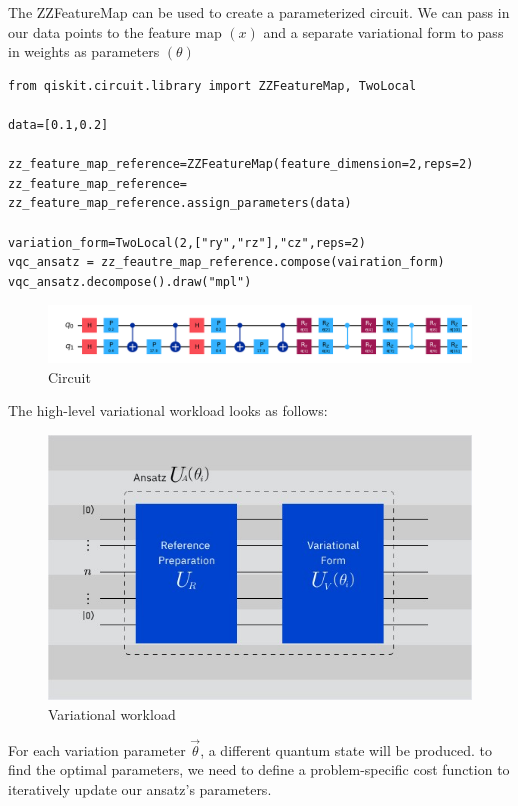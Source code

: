 \documentclass[12pt, oneside]{book}
\theoremstyle{definition}
\theoremstyle{definition}
\theoremstyle{remark}
\begin{document}
The ZZFeatureMap can be used to create a parameterized circuit. We can pass in our data points to the feature map $(x)$ and a separate variational form to pass in weights as parameters $(\theta)$
\begin{lstlisting}
from qiskit.circuit.library import ZZFeatureMap, TwoLocal

data=[0.1,0.2]

zz_feature_map_reference=ZZFeatureMap(feature_dimension=2,reps=2)
zz_feature_map_reference= zz_feature_map_reference.assign_parameters(data)

variation_form=TwoLocal(2,["ry","rz"],"cz",reps=2)
vqc_ansatz = zz_feautre_map_reference.compose(vairation_form)
vqc_ansatz.decompose().draw("mpl")
\end{lstlisting}
\begin{figure}[H]
    \centering
    \includegraphics[width=0.5\linewidth]{../images/qml_circ.png}
    \caption{ Circuit}
    \label{fig:qlm_circ}
\end{figure}

The high-level variational workload looks as follows:
\begin{figure}[H]
    \centering
    \includegraphics[width=0.5\linewidth]{../images/ansatz.png}
    \caption{Variational workload}
    \label{fig:ansatz}
\end{figure}
For each variation parameter $\vec{\theta}$, a different quantum state will be produced. to find the optimal parameters, we need to define a problem-specific cost function to iteratively update our ansatz's parameters.
\end{document}
